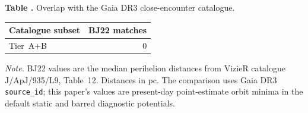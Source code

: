 \begin{center}
\label{tab:bj22_overlap}
\begin{minipage}{\linewidth}
\small\textbf{Table \thetable.} Overlap with the \citet{BailerJones2022} Gaia DR3 close-encounter catalogue.
\end{minipage}
\vspace{0.4ex}

\small
\setlength{\tabcolsep}{0pt}
\begin{tabular*}{\linewidth}{@{\extracolsep{\fill}}lr@{}}
\hline\hline
Catalogue subset & BJ22 matches \\
\hline
Tier~A+B & 0 \\
\hline
\end{tabular*}
\vspace{0.5ex}

\begin{minipage}{0.95\linewidth}
\footnotesize
\textit{Note.} BJ22 values are the median perihelion distances from VizieR catalogue J/ApJ/935/L9, Table~12. Distances in pc. The comparison uses Gaia DR3 \texttt{source\_id}; this paper's values are present-day point-estimate orbit minima in the default static and barred diagnostic potentials.
\end{minipage}
\end{center}
